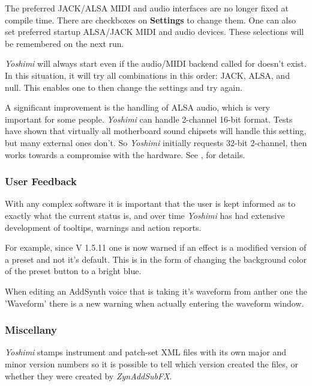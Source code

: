 \documentclass[
 11pt,
 twoside,
 a4paper,
 final                                 %
]{article}
\begin{document}
   The preferred JACK/ALSA MIDI and audio interfaces are no longer fixed at
   compile time. There are checkboxes on \textbf{Settings} to change them.
   One can also set preferred startup ALSA/JACK MIDI and audio devices.
   These selections will be remembered on the next run.

   \textsl{Yoshimi} will always start even if the audio/MIDI backend called
   for doesn't exist. In this situation, it will try all combinations in this
   order: JACK, ALSA, and null. This enables one to then change the settings
   and try again.

   A significant improvement is the handling of ALSA audio, which is very
   important for some people.  \textsl{Yoshimi} can handle 2-channel 16-bit
   format. Tests have shown that virtually all motherboard sound chipsets will
   handle this setting, but many external ones don't.  So \textsl{Yoshimi}
   initially requests 32-bit 2-channel, then works towards a compromise with the
   hardware.
   See , for details.

\subsubsection{User Feedback}
\label{subsubsec:new_features_user_feedback}
   With any complex software it is important that the user is kept informed
   as to exactly what the current status is, and over time \textsl{Yoshimi}
   has had extensive development of tooltips, warnings and action reports.

   For example, since V 1.5.11 one is now warned if an effect is a modified
   version of a preset and not it's default. This is in the form of changing
   the background color of the preset button to a bright blue.

   When editing an AddSynth voice that is taking it's waveform from anther one
   the 'Waveform' there is a new warning when actually entering
   the waveform window.

\subsubsection{Miscellany}
\label{subsubsec:new_features_miscellany}

   \textsl{Yoshimi} stamps instrument and patch-set XML files with its own
   major and minor version numbers so it is possible to tell which version
   created the files, or whether they were created by \textsl{ZynAddSubFX}.
\end{document}
